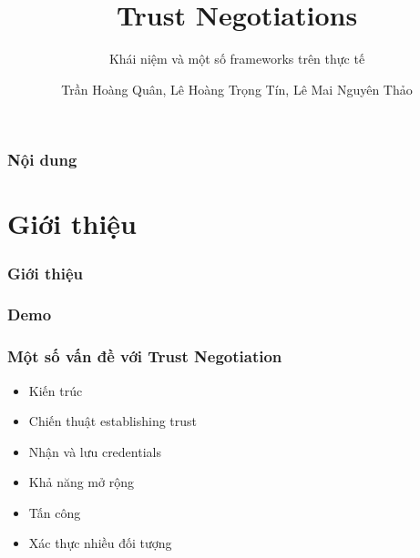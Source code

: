 \documentclass[11pt]{beamer}
\begin{document}
\author{Trần Hoàng Quân, Lê Hoàng Trọng Tín, Lê Mai Nguyên Thảo}
\title{Trust Negotiations}
\subtitle{Khái niệm và một số frameworks trên thực tế}
\begin{frame}[plain]
	\maketitle
\end{frame}

\begin{frame}
	\frametitle{Nội dung}
	\tableofcontents
\end{frame}

\section{Giới thiệu}
\begin{frame}
	\frametitle{Giới thiệu}
\end{frame}

\begin{frame}
\frametitle{Demo}
\end{frame}

\begin{frame}
\frametitle{Một số vấn đề với Trust Negotiation}

\begin{itemize}
\item Kiến trúc%
\item Chiến thuật establishing trust
\item Nhận và lưu credentials
\item Khả năng mở rộng
\item Tấn công\cite{10.1007/3-540-44875-6_20}
\item Xác thực nhiều đối tượng
\end{itemize}
\end{frame}

\begin{frame}
\printbibliography
\end{frame}
\end{document}
